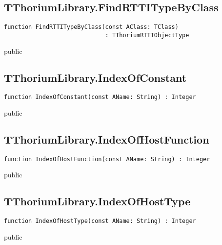 \subsection{TThoriumLibrary.FindRTTITypeByClass}
\label{thoriumcorepkg:thorium:tthoriumlibrary:findrttitypebyclass}
\begin{FPCList}
\Declaration 

\begin{verbatim}
function FindRTTITypeByClass(const AClass: TClass)
                             : TThoriumRTTIObjectType
\end{verbatim}
\Visibility
public
\end{FPCList}
\subsection{TThoriumLibrary.IndexOfConstant}
\label{thoriumcorepkg:thorium:tthoriumlibrary:indexofconstant}
\begin{FPCList}
\Declaration 

\begin{verbatim}
function IndexOfConstant(const AName: String) : Integer
\end{verbatim}
\Visibility
public
\end{FPCList}
\subsection{TThoriumLibrary.IndexOfHostFunction}
\label{thoriumcorepkg:thorium:tthoriumlibrary:indexofhostfunction}
\begin{FPCList}
\Declaration 

\begin{verbatim}
function IndexOfHostFunction(const AName: String) : Integer
\end{verbatim}
\Visibility
public
\end{FPCList}
\subsection{TThoriumLibrary.IndexOfHostType}
\label{thoriumcorepkg:thorium:tthoriumlibrary:indexofhosttype}
\begin{FPCList}
\Declaration 

\begin{verbatim}
function IndexOfHostType(const AName: String) : Integer
\end{verbatim}
\Visibility
public
\end{FPCList}
